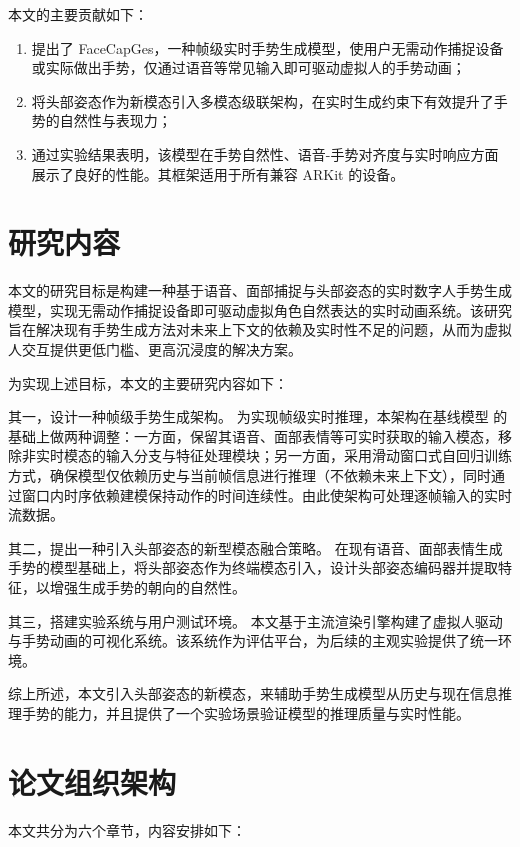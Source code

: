 本文的主要贡献如下：

\begin{enumerate}
\item 提出了 FaceCapGes，一种帧级实时手势生成模型，使用户无需动作捕捉设备或实际做出手势，仅通过语音等常见输入即可驱动虚拟人的手势动画；
\item 将头部姿态作为新模态引入多模态级联架构，在实时生成约束下有效提升了手势的自然性与表现力；
\item 通过实验结果表明，该模型在手势自然性、语音-手势对齐度与实时响应方面展示了良好的性能。其框架适用于所有兼容 ARKit 的设备。
\end{enumerate}

\section{研究内容}

本文的研究目标是构建一种基于语音、面部捕捉与头部姿态的实时数字人手势生成模型，实现无需动作捕捉设备即可驱动虚拟角色自然表达的实时动画系统。该研究旨在解决现有手势生成方法对未来上下文的依赖及实时性不足的问题，从而为虚拟人交互提供更低门槛、更高沉浸度的解决方案。

为实现上述目标，本文的主要研究内容如下：

其一，设计一种帧级手势生成架构。
为实现帧级实时推理，本架构在基线模型 \cite {beatcamn} 的基础上做两种调整：一方面，保留其语音、面部表情等可实时获取的输入模态，移除非实时模态的输入分支与特征处理模块；另一方面，采用滑动窗口式自回归训练方式，确保模型仅依赖历史与当前帧信息进行推理（不依赖未来上下文），同时通过窗口内时序依赖建模保持动作的时间连续性。由此使架构可处理逐帧输入的实时流数据。

其二，提出一种引入头部姿态的新型模态融合策略。
在现有语音、面部表情生成手势的模型基础上，将头部姿态作为终端模态引入，设计头部姿态编码器并提取特征，以增强生成手势的朝向的自然性。

其三，搭建实验系统与用户测试环境。
本文基于主流渲染引擎构建了虚拟人驱动与手势动画的可视化系统。该系统作为评估平台，为后续的主观实验提供了统一环境。

综上所述，本文引入头部姿态的新模态，来辅助手势生成模型从历史与现在信息推理手势的能力，并且提供了一个实验场景验证模型的推理质量与实时性能。

\section{论文组织架构}

本文共分为六个章节，内容安排如下：

